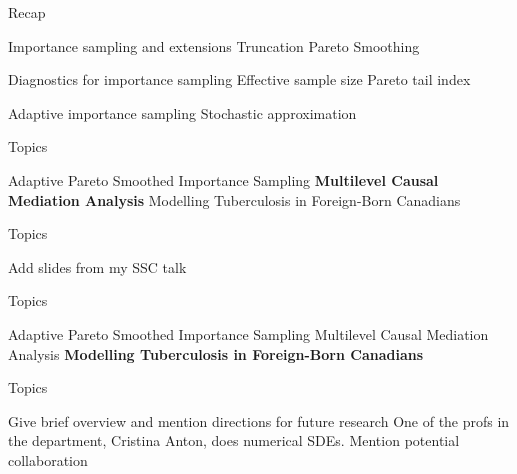 \documentclass[14pt]{beamer}
\begin{document}
\begin{frame}{Recap}
    \begin{outline}
        \1 Importance sampling and extensions
            \2 Truncation
            \2 Pareto Smoothing \newline
        
        \1 Diagnostics for importance sampling
            \2 Effective sample size
            \2 Pareto tail index \newline

        \1 Adaptive importance sampling
            \2 Stochastic approximation
    \end{outline}
\end{frame}



\begin{frame}{Topics}
    \begin{outline}
        \1 Adaptive Pareto Smoothed Importance Sampling \newline
        \1 \textbf{Multilevel Causal Mediation Analysis} \newline
        \1 Modelling Tuberculosis in Foreign-Born Canadians
    \end{outline}
\end{frame}

\begin{frame}{Topics}
    \begin{outline}
        \1 Add slides from my SSC talk
    \end{outline}
\end{frame}

\begin{frame}{Topics}
    \begin{outline}
        \1 Adaptive Pareto Smoothed Importance Sampling \newline
        \1 Multilevel Causal Mediation Analysis \newline
        \1 \textbf{Modelling Tuberculosis in Foreign-Born Canadians}
    \end{outline}
\end{frame}

\begin{frame}{Topics}
    \begin{outline}
        \1 Give brief overview and mention directions for future research
        \1 One of the profs in the department, Cristina Anton, does numerical SDEs. Mention potential collaboration
    \end{outline}
\end{frame}
\end{document}
